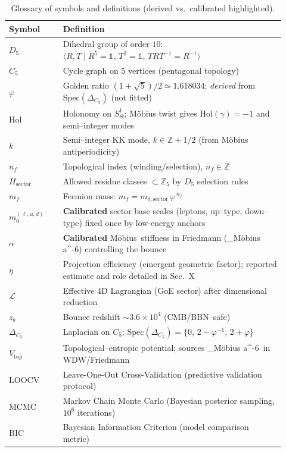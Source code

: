 \documentclass[12pt]{article}
\newcommand{\Moebius}{M\"obius}
\newcommand{\SigMoeb}{\Sigma\text{--}\Moebius}
\newcommand{\StiffTerm}{\alpha_{\SigMoeb} a^{-6}}
\begin{document}
\begin{table}[ht]
\centering
\caption{Glossary of symbols and definitions (derived vs.\ calibrated highlighted).}
\label{tab:glossary}
\begin{tabular}{p{0.18\linewidth}p{0.74\linewidth}}
\toprule
\textbf{Symbol} & \textbf{Definition} \\
\midrule
$D_5$ & Dihedral group of order $10$: $\langle R,T \mid R^5=\mathbb{1},\,T^2=\mathbb{1},\,TRT^{-1}=R^{-1}\rangle$ \\
$C_5$ & Cycle graph on 5 vertices (pentagonal topology) \\
$\varphi$ & Golden ratio $(1+\sqrt{5})/2\simeq1.618034$; \emph{derived} from $\mathrm{Spec}(\Delta_{C_5})$ (not fitted) \\
$\mathrm{Hol}$ & Holonomy on $S^1_\Theta$; M\"obius twist gives $\mathrm{Hol}(\gamma)=-1$ and semi--integer modes \\
$k$ & Semi--integer KK mode, $k\in\mathbb{Z}+1/2$ (from M\"obius antiperiodicity) \\
$n_f$ & Topological index (winding/selection), $n_f\in\mathbb{Z}$ \\
$H_{\text{sector}}$ & Allowed residue classes $\subset\mathbb{Z}_5$ by $D_5$ selection rules \\
$m_f$ & Fermion mass: $m_f=m_{0,\text{sector}}\,\varphi^{\,n_f}$ \\
$m_0^{(\ell,u,d)}$ & \textbf{Calibrated} sector base scales (leptons, up--type, down--type) fixed once by low-energy anchors \\
$\alpha$ & \textbf{Calibrated} \SigMoeb\ stiffness in Friedmann (\StiffTerm) controlling the bounce \\
$\eta$ & Projection efficiency (emergent geometric factor); reported estimate and role detailed in Sec.~X \\
$\mathcal{L}$ & Effective 4D Lagrangian (GoE sector) after dimensional reduction \\
$z_b$ & Bounce redshift $\sim 3.6\times10^4$ (CMB/BBN--safe) \\
$\Delta_{C_5}$ & Laplacian on $C_5$; $\mathrm{Spec}(\Delta_{C_5})=\{0,\,2-\varphi^{-1},\,2+\varphi\}$ \\
$V_{\text{top}}$ & Topological--entropic potential; sources \StiffTerm\ in WDW/Friedmann \\
LOOCV & Leave-One-Out Cross-Validation (predictive validation protocol) \\
MCMC & Markov Chain Monte Carlo (Bayesian posterior sampling, $10^6$ iterations) \\
BIC & Bayesian Information Criterion (model comparison metric) \\
\bottomrule
\end{tabular}
\end{table}
\end{document}
